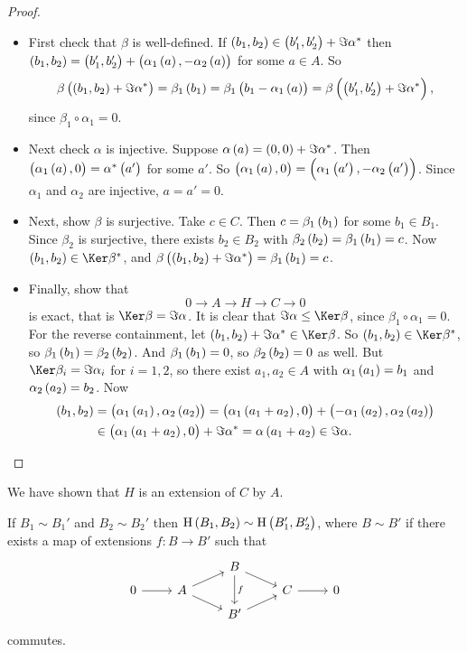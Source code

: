 \begin{proof}
\hfill
\begin{itemize}
\item First check that $ \beta $ is well-defined. If $ \br{b_1, b_2} \in \br{b_1', b_2'} + \Im \alpha^* $ then $ \br{b_1, b_2} = \br{b_1', b_2'} + \br{\alpha_1\br{a}, -\alpha_2\br{a}} $ for some $ a \in A $. So
$$ \beta\br{\br{b_1, b_2} + \Im \alpha^*} = \beta_1\br{b_1} = \beta_1\br{b_1 - \alpha_1\br{a}} = \beta\br{\br{b_1', b_2'} + \Im \alpha^*}, $$
since $ \beta_1 \circ \alpha_1 = 0 $.
\item Next check $ \alpha $ is injective. Suppose $ \alpha\br{a} = \br{0, 0} + \Im \alpha^* $. Then $ \br{\alpha_1\br{a}, 0} = \alpha^*\br{a'} $ for some $ a' $. So $ \br{\alpha_1\br{a}, 0} = \br{\alpha_1\br{a'}, -\alpha_2\br{a'}} $. Since $ \alpha_1 $ and $ \alpha_2 $ are injective, $ a = a' = 0 $.
\item Next, show $ \beta $ is surjective. Take $ c \in C $. Then $ c = \beta_1\br{b_1} $ for some $ b_1 \in B_1 $. Since $ \beta_2 $ is surjective, there exists $ b_2 \in B_2 $ with $ \beta_2\br{b_2} = \beta_1\br{b_1} = c $. Now $ \br{b_1, b_2} \in \Ker \beta^* $, and $ \beta\br{\br{b_1, b_2} + \Im \alpha^*} = \beta_1\br{b_1} = c $.

\pagebreak

\item Finally, show that
$$ 0 \to A \to H \to C \to 0 $$
is exact, that is $ \Ker \beta = \Im \alpha $. It is clear that $ \Im \alpha \le \Ker \beta $, since $ \beta_1 \circ \alpha_1 = 0 $. For the reverse containment, let $ \br{b_1, b_2} + \Im \alpha^* \in \Ker \beta $. So $ \br{b_1, b_2} \in \Ker \beta^* $, so $ \beta_1\br{b_1} = \beta_2\br{b_2} $. And $ \beta_1\br{b_1} = 0 $, so $ \beta_2\br{b_2} = 0 $ as well. But $ \Ker \beta_i = \Im \alpha_i $ for $ i = 1, 2 $, so there exist $ a_1, a_2 \in A $ with $ \alpha_1\br{a_1} = b_1 $ and $ \alpha_2\br{a_2} = b_2 $. Now
\begin{align*}
\br{b_1, b_2}
& = \br{\alpha_1\br{a_1}, \alpha_2\br{a_2}}
= \br{\alpha_1\br{a_1 + a_2}, 0} + \br{-\alpha_1\br{a_2}, \alpha_2\br{a_2}} \\
& \in \br{\alpha_1\br{a_1 + a_2}, 0} + \Im \alpha^*
= \alpha\br{a_1 + a_2}
\in \Im \alpha.
\end{align*}
\end{itemize}
\end{proof}

We have shown that $ H $ is an extension of $ C $ by $ A $.

\begin{proposition}
If $ B_1 \sim B_1' $ and $ B_2 \sim B_2' $ then $ \H\br{B_1, B_2} \sim \H\br{B_1', B_2'} $, where $ B \sim B' $ if there exists a map of extensions $ f : B \to B' $ such that
$$
\begin{tikzcd}[row sep=tiny]
& & B \arrow{dr} \arrow{dd}{f} & & \\
0 \arrow{r} & A \arrow{ur} \arrow[swap]{dr} & & C \arrow{r} & 0 \\
& & B' \arrow[swap]{ur} & &
\end{tikzcd}
$$
commutes.
\end{proposition}

